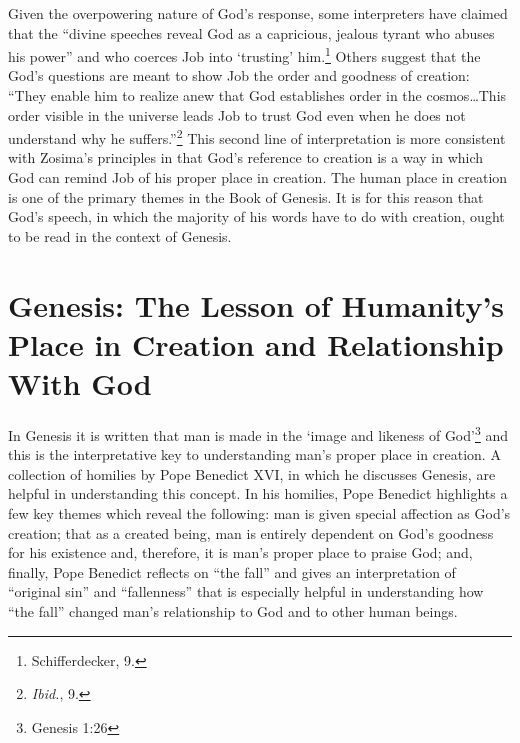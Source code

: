 Given the overpowering nature of God's response, some interpreters have claimed that the ``divine speeches reveal God as a capricious, jealous tyrant who abuses his power'' and who coerces Job into `trusting' him.\footnote{Schifferdecker, 9.} Others suggest that the God's questions are meant to show Job the order and goodness of creation: ``They enable him to realize anew that God establishes order in the cosmos\ldots This order visible in the universe leads Job to trust God even when he does not understand why he suffers.''\footnote{\emph{Ibid.}, 9.} This second line of interpretation is more consistent with Zosima's principles in that God's reference to creation is a way in which God can remind Job of his proper place in creation. The human place in creation is one of the primary themes in the Book of Genesis. It is for this reason that God's speech, in which the majority of his words have to do with creation, ought to be read in the context of Genesis.

\section{Genesis: The Lesson of Humanity's Place in Creation and Relationship With God}
In Genesis it is written that man is made in the `image and likeness of God'\footnote{Genesis 1:26} and this is the interpretative key to understanding man's proper place in creation. A collection of homilies by Pope Benedict XVI, in which he discusses Genesis, are helpful in understanding this concept. In his homilies, Pope Benedict highlights a few key themes which reveal the following: man is given special affection as God's creation; that as a created being, man is entirely dependent on God's goodness for his existence and, therefore, it is man's proper place to praise God; and, finally, Pope Benedict reflects on ``the fall'' and gives an interpretation of ``original sin'' and ``fallenness'' that is especially helpful in understanding how ``the fall'' changed man's relationship to God and to other human beings. 

